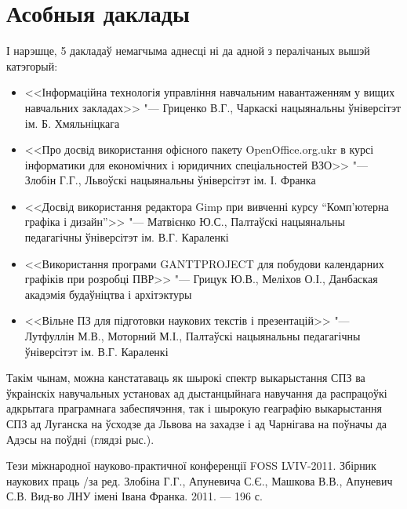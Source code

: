 \documentclass[10pt, a5paper]{article}
\begin{document}
\section*{Асобныя даклады}
І нарэшце, 5 дакладаў немагчыма аднесці ні да адной з пералічаных вышэй катэгорый:
\begin{itemize}
\item  <<Інформаційна технологія управління навчальним навантаженням у вищих навчальних закладах>> "--- Гриценко В.Г., Чаркаскі нацыянальны ўніверсітэт ім. Б. Хмяльніцкага
\item  <<Про досвід використання офісного  пакету OpenOffice.org.ukr в курсі інформатики для економічних і юридичних спеціальностей ВЗО>> "--- Злобін Г.Г., Львоўскі нацыянальны ўніверсітэт ім. І. Франка 
\item  <<Досвід використання  редактора Gimp при вивченні курсу “Комп'ютерна графіка і дизайн”>> "--- Матвієнко Ю.С., Палтаўскі нацыянальны педагагічны ўніверсітэт ім. В.Г. Караленкі
\item <<Використання програми GANTTPROJECT для побудови календарних графіків при розробці ПВР>> "--- Грицук Ю.В., Меліхов О.І., Данбаская акадэмія будаўніцтва і архітэктуры
\item <<Вільне ПЗ для підготовки наукових текстів і презентацій>> "--- Лутфуллін М.В., Моторний М.І., Палтаўскі нацыянальны педагагічны ўніверсітэт ім. В.Г. Караленкі
\end{itemize}

	Такім чынам, можна канстатаваць як шырокі спектр выкарыстання СПЗ ва ўкраінскіх навучальных установах ад дыстанцыйнага навучання да распрацоўкі адкрытага праграмнага забеспячэння, так і шырокую геаграфію выкарыстання СПЗ ад Луганска на ўсходзе да Львова на захадзе і ад Чарнігава на поўначы да Адэсы на поўдні (глядзі рыс.).

\begin{figure}[ht]
\label{pic:fl1}
\end{figure}

\begin{thebibliography}{9}
Тези міжнародної науково-практичної конференції FOSS LVIV-2011. Збірник наукових праць /за ред. Злобіна Г.Г., Апуневича С.Є., Машкова В.В., Апуневич С.В. Вид-во ЛНУ імені Івана Франка. 2011. --- 196 с.
\end{thebibliography}
\end{document}
